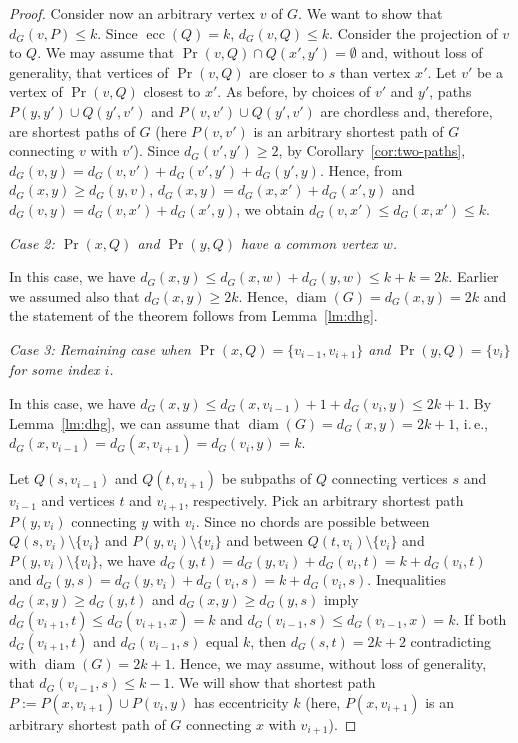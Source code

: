 \documentclass[10pt]{llncs}
\makeatletter
\newcommand{\ie}{i.\,e.\@ifnextchar{,}{}{~}}
\DeclareMathOperator{\ecc}{ecc}
\DeclareMathOperator{\diam}{diam}
\makeatother
\begin{document}
\begin{proof}
Consider now an arbitrary vertex $v$ of $G$. 
We want to show that $d_G(v,P) \leq k$. 
Since $\ecc(Q) = k$, $d_G(v,Q) \leq k$. 
Consider the projection of $v$ to $Q$. 
We may assume that $\Pr(v,Q) \cap Q(x',y') = \emptyset$ and, without loss of generality, that vertices of $\Pr(v,Q)$ are closer to $s$ than vertex $x'$. 
Let $v'$ be a vertex of $\Pr(v,Q)$ closest to $x'$.
As before, by choices of $v'$ and $y'$, paths $P(y,y') \cup Q(y',v')$ and $P(v,v') \cup Q(y',v')$ are chordless and, therefore, are shortest paths of $G$ (here $P(v,v')$ is an arbitrary shortest path of $G$ connecting $v$ with $v'$). 
Since $d_G(v',y') \geq 2$, by Corollary~\ref{cor:two-paths}, $d_G(v,y) = d_G(v,v') + d_G(v',y') + d_G(y',y)$. 
Hence, from $d_G(x,y) \geq d_G(y,v)$, $d_G(x,y) = d_G(x,x') + d_G(x',y)$ and $d_G(v,y) = d_G(v,x') + d_G(x',y)$, we obtain $d_G(v,x') \leq d_G(x,x') \leq k$.

\medskip
\noindent
\emph{Case 2: $\Pr(x,Q)$ and $\Pr(y,Q)$ have a common vertex $w$.} 

\medskip
\noindent
In this case, we have $d_G(x,y) \leq d_G(x,w) + d_G(y,w) \leq k + k = 2k$. 
Earlier we assumed also that $d_G(x,y) \geq 2k$.
Hence, $\diam(G) = d_G(x,y) = 2k$ and the statement of the theorem follows from Lemma~\ref{lm:dhg}. 

\medskip
\noindent
\emph{Case 3: Remaining case when $\Pr(x,Q) = \{ v_{i-1}, v_{i+1} \}$ and $\Pr(y,Q) = \{ v_i \}$ for some index $i$.}

\medskip
\noindent
In this case, we have $d_G(x,y) \leq d_G(x,v_{i-1}) + 1 + d_G(v_{i},y) \leq 2k + 1$. 
By Lemma~\ref{lm:dhg}, we can assume that $\diam(G) = d_G(x,y) = 2k + 1$, \ie, $d_G(x,v_{i-1}) = d_G(x,v_{i+1}) = d_G(v_{i},y) = k$.

Let $Q(s,v_{i-1})$ and $Q(t,v_{i+1})$ be subpaths of $Q$ connecting vertices $s$ and $v_{i-1}$ and vertices $t$ and $v_{i+1}$, respectively. 
Pick an arbitrary shortest path $P(y,v_{i})$ connecting $y$ with $v_{i}$. 
Since no chords are possible between $Q(s,v_{i}) \setminus \{ v_{i} \}$ and $P(y,v_{i}) \setminus \{ v_{i} \}$ and between $Q(t,v_{i}) \setminus \{ v_{i} \}$ and $P(y,v_{i}) \setminus \{ v_{i} \}$, we have
$d_G(y,t) = d_G(y,v_{i}) + d_G(v_{i},t) = k + d_G(v_{i},t)$ and $d_G(y,s) = d_G(y,v_{i}) + d_G(v_{i},s) = k + d_G(v_{i},s)$.
Inequalities $d_G(x,y) \geq d_G(y,t)$ and $d_G(x,y) \geq d_G(y,s)$ imply $d_G(v_{i+1},t) \leq d_G(v_{i+1},x) = k$ and $d_G(v_{i-1},s) \leq d_G(v_{i-1},x) = k$. 
If both $d_G(v_{i+1},t)$ and $d_G(v_{i-1},s)$ equal $k$, then $d_G(s,t) = 2k + 2$ contradicting with $\diam(G) = 2k+1$. 
Hence, we may assume, without loss of generality, that $d_G(v_{i-1},s) \leq k-1$. 
We will show that shortest path $P := P(x,v_{i+1}) \cup P(v_{i},y)$ has eccentricity $k$ (here, $P(x,v_{i+1})$ is an arbitrary shortest path of $G$ connecting $x$ with $v_{i+1}$). 


\end{proof}
\end{document}
